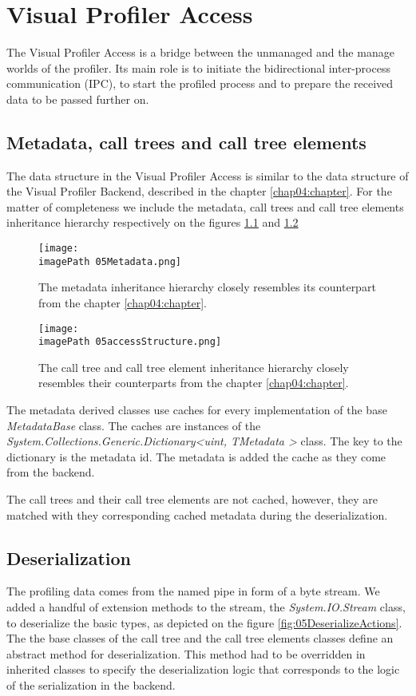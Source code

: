 \chapter{Visual Profiler Access}
The Visual Profiler Access is a bridge between the unmanaged and the manage worlds of the profiler. Its main role is to initiate the bidirectional inter-process communication (IPC), to start the profiled process and to prepare the received data to be passed further on.

\section{Metadata, call trees and call tree elements}
The data structure in the Visual Profiler Access is similar to the data structure of the Visual Profiler Backend, described in the chapter \ref{chap04:chapter}. For the matter of completeness we include the metadata, call trees and call tree elements inheritance hierarchy respectively on the figures \ref{fig:05Metadata} and \ref{fig:05accessStructure}

\begin{figure}
	\centering
		\texttt{[image: \\imagePath 05Metadata.png]}
		\caption{The metadata inheritance hierarchy closely resembles its counterpart from the chapter \ref{chap04:chapter}.}
	\label{fig:05Metadata}
\end{figure}

\begin{figure}
	\centering
		\texttt{[image: \\imagePath 05accessStructure.png]}
		\caption{The call tree and call tree element inheritance hierarchy closely resembles their counterparts from the chapter \ref{chap04:chapter}.}
	\label{fig:05accessStructure}
\end{figure}

The metadata derived classes use caches for every implementation of the base \textit{MetadataBase} class. The caches are instances of the \textit{System.Collections.Generic.Dictionary\textless uint, TMetadata \textgreater} class. The key to the dictionary is the metadata id. The metadata is added the cache as they come from the backend.

The call trees and their call tree elements are not cached, however, they are matched with they corresponding cached metadata during the deserialization.

\section{Deserialization}
The profiling data comes from the named pipe in form of a byte stream. We added a handful of extension methods to the stream, the \textit{System.IO.Stream} class, to deserialize the basic types, as depicted on the figure \ref{fig:05DeserializeActions}. The the base classes of the call tree and the call tree elements classes define an abstract method for deserialization. This method had to be overridden in inherited classes to specify the deserialization logic that corresponds to the logic of the serialization in the backend.

